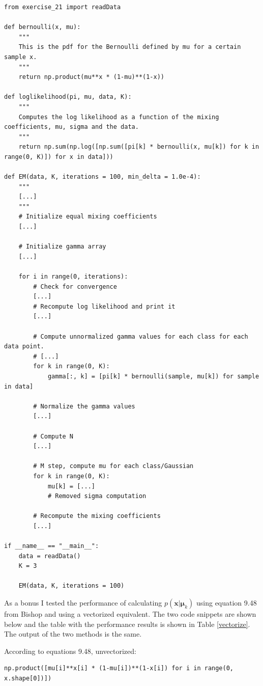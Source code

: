 \documentclass[paper=a4, fontsize=10pt]{scrartcl} %
\numberwithin{equation}{section} %
\numberwithin{figure}{section} %
\numberwithin{table}{section} %
\begin{document}
\begin{verbatim}
from exercise_21 import readData

def bernoulli(x, mu):
	"""
	This is the pdf for the Bernoulli defined by mu for a certain sample x.
	"""
	return np.product(mu**x * (1-mu)**(1-x))

def loglikelihood(pi, mu, data, K):
	"""
	Computes the log likelihood as a function of the mixing coefficients, mu, sigma and the data.
	"""
	return np.sum(np.log([np.sum([pi[k] * bernoulli(x, mu[k]) for k in range(0, K)]) for x in data]))

def EM(data, K, iterations = 100, min_delta = 1.0e-4):
	"""
	[...]
	"""
	# Initialize equal mixing coefficients
	[...]

	# Initialize gamma array
	[...]

	for i in range(0, iterations):
		# Check for convergence
		[...]
		# Recompute log likelihood and print it
		[...]

		# Compute unnormalized gamma values for each class for each data point.
		# [...]
		for k in range(0, K):
			gamma[:, k] = [pi[k] * bernoulli(sample, mu[k]) for sample in data]

		# Normalize the gamma values
		[...]

		# Compute N
		[...]

		# M step, compute mu for each class/Gaussian
		for k in range(0, K):
			mu[k] = [...]
			# Removed sigma computation

		# Recompute the mixing coefficients
		[...]

if __name__ == "__main__":
	data = readData()
	K = 3

	EM(data, K, iterations = 100)
\end{verbatim}

As a bonus I tested the performance of calculating $p(\boldsymbol x \vert \boldsymbol \mu_k)$ using equation 9.48 from Bishop and using a vectorized equivalent. The two code snippets are shown below and the table with the performance results is shown in Table \ref{vectorize}. The output of the two methods is the same.

According to equations 9.48, unvectorized:
\begin{verbatim}
np.product([mu[i]**x[i] * (1-mu[i])**(1-x[i]) for i in range(0, x.shape[0])])
\end{verbatim}
\end{document}
